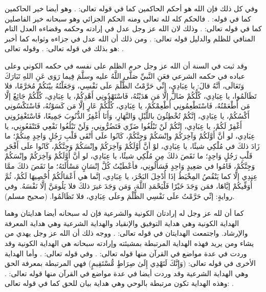 وفي كل ذلك فإن الله هو أحكم الحاكمين كما في قوله تعالى:
\quranayah*[95][8]{\footnotesize \surahname*[95]}.
وهو أيضا خير الحاكمين كما في قوله:
\quranayah*[10][109]{\footnotesize \surahname*[10]}.
فالحكم كله لله تعالى ومنه الحكم الجزائي وهو سبحانه خير الفاصلين كما في قوله تعالى:
\quranayah*[6][57][14]{\footnotesize \surahname*[6]}. وذلك لان الله عز وجل عدل في إرادته وحكمه وقضاءه العدل التام المنافي للظلم والدليل قوله تعالى:
\quranayah*[3][108]{\footnotesize \surahname*[3]}. ومن ذلك أن الله عدل في جزاءه وثوابه كما أخبر هو بذلك في قوله تعالى:
\quranayah*[39][69]{\footnotesize \surahname*[69]}. وقوله تعالى:
\quranayah*[10][47]{\footnotesize \surahname*[10]}.

وقد ثبت في السنة أن الله عز وجل حرم الظلم على نفسه في حكمه الكوني وعلى عباده في حكمه الشرعي فعَنِ النَّبيِّ صَلَّى اللَّهُ عليه وسلَّمَ فِيما رَوَى عَنِ اللهِ تَبَارَكَ وَتَعَالَى، أنَّهُ قالَ: يا عِبَادِي، إنِّي حَرَّمْتُ الظُّلْمَ علَى نَفْسِي، وَجَعَلْتُهُ بيْنَكُمْ مُحَرَّمًا، فلا تَظَالَمُوا، يا عِبَادِي، كُلُّكُمْ ضَالٌّ إلَّا مَن هَدَيْتُهُ، فَاسْتَهْدُونِي أَهْدِكُمْ، يا عِبَادِي، كُلُّكُمْ جَائِعٌ إلَّا مَن أَطْعَمْتُهُ، فَاسْتَطْعِمُونِي أُطْعِمْكُمْ، يا عِبَادِي، كُلُّكُمْ عَارٍ إلَّا مَن كَسَوْتُهُ، فَاسْتَكْسُونِي أَكْسُكُمْ، يا عِبَادِي، إنَّكُمْ تُخْطِئُونَ باللَّيْلِ وَالنَّهَارِ، وَأَنَا أَغْفِرُ الذُّنُوبَ جَمِيعًا، فَاسْتَغْفِرُونِي أَغْفِرْ لَكُمْ، يا عِبَادِي، إنَّكُمْ لَنْ تَبْلُغُوا ضَرِّي فَتَضُرُّونِي، وَلَنْ تَبْلُغُوا نَفْعِي فَتَنْفَعُونِي، يا عِبَادِي، لو أنَّ أَوَّلَكُمْ وَآخِرَكُمْ وإنْسَكُمْ وَجِنَّكُمْ، كَانُوا علَى أَتْقَى قَلْبِ رَجُلٍ وَاحِدٍ مِنكُمْ؛ ما زَادَ ذلكَ في مُلْكِي شيئًا، يا عِبَادِي، لوْ أنَّ أَوَّلَكُمْ وَآخِرَكُمْ وإنْسَكُمْ وَجِنَّكُمْ، كَانُوا علَى أَفْجَرِ قَلْبِ رَجُلٍ وَاحِدٍ؛ ما نَقَصَ ذلكَ مِن مُلْكِي شيئًا، يا عِبَادِي، لو أنَّ أَوَّلَكُمْ وَآخِرَكُمْ وإنْسَكُمْ وَجِنَّكُمْ، قَامُوا في صَعِيدٍ وَاحِدٍ فَسَأَلُونِي، فأعْطَيْتُ كُلَّ إنْسَانٍ مَسْأَلَتَهُ؛ ما نَقَصَ ذلكَ ممَّا عِندِي إلَّا كما يَنْقُصُ المِخْيَطُ إذَا أُدْخِلَ البَحْرَ، يا عِبَادِي، إنَّما هي أَعْمَالُكُمْ أُحْصِيهَا لَكُمْ، ثُمَّ أُوَفِّيكُمْ إيَّاهَا، فمَن وَجَدَ خَيْرًا فَلْيَحْمَدِ اللَّهَ، وَمَن وَجَدَ غيرَ ذلكَ فلا يَلُومَنَّ إلَّا نَفْسَهُ. وفي روايةٍ: إنِّي حَرَّمْتُ علَى نَفْسِي الظُّلْمَ وعلَى عِبَادِي، فلا تَظَالَمُوا. {\footnotesize (صحيح مسلم)}.

كما أن لله عز وجل له إرادتان الكونية والشرعية فإن له سبحانه أيضا هدايتان وهما الهداية الكونية وهي هداية التوفيق والإنقياد والهداية الشرعية وهي هداية المعرفة والإرشاد. واجتمعت الهدايتان في قوله تعالى:
\quranayah*[42][52]{\footnotesize \surahname*[42]}. ووجه ذلك أن الله عز وجل يهدي من يشاء ومن يريد فهذه الهداية المرتبطة بمشيئته وإرادته سبحانه هي الهداية الكونية وقد وردت في عدة مواضع في القرآن منها قوله تعالى:
\quranayah*[28][56]{\footnotesize \surahname*[28]}. وفي قوله تعالى:
\quranayah*[22][16]{\footnotesize \surahname*[22]}. وأما الهداية الأخرى في قوله تعالى: (وَإِنَّكَ لَتَهْدِي إِلَىٰ صِرَاطٍ مُّسْتَقِيمٍ)
فهي المرتبطة بمعرفة الحق وهي الهداية الشرعية وقد وردت أيضا في عدة مواضع في القرآن منها قوله تعالى:
\quranayah*[4][26]{\footnotesize \surahname*[4]}. وهذه الهداية تكون مرتبطة بالوحي وهي هداية بيان للحق كما في قوله تعالى:
\quranayah*[34][6]{\footnotesize \surahname*[6]}.

